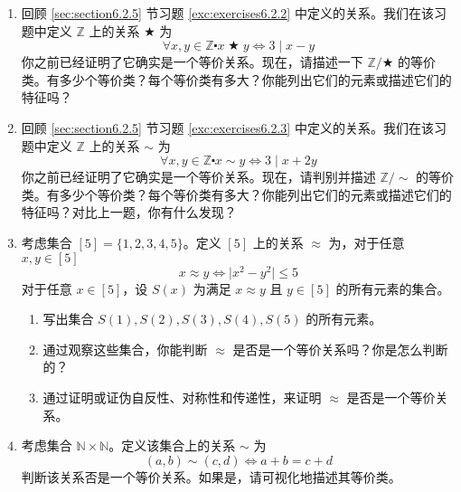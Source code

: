 \begin{enumerate}[label=(\arabic*)]
    \item 回顾 \ref{sec:section6.2.5} 节习题 \ref{exc:exercises6.2.2} 中定义的关系。我们在该习题中定义 $\mathbb{Z}$ 上的关系 $\bigstar$ 为
    \[\forall x, y \in \mathbb{Z} \centerdot x \;\bigstar\; y \iff 3 \mid x - y\]
    你之前已经证明了它确实是一个等价关系。现在，请描述一下 $\mathbb{Z}/\bigstar$ 的等价类。有多少个等价类？每个等价类有多大？你能列出它们的元素或描述它们的特征吗？
    \item 回顾 \ref{sec:section6.2.5} 节习题 \ref{exc:exercises6.2.3} 中定义的关系。我们在该习题中定义 $\mathbb{Z}$ 上的关系 $\sim$ 为
    \[\forall x, y \in \mathbb{Z} \centerdot x \sim y \iff 3 \mid x + 2y\]
    你之前已经证明了它确实是一个等价关系。现在，请判别并描述 $\mathbb{Z}/\sim$ 的等价类。有多少个等价类？每个等价类有多大？你能列出它们的元素或描述它们的特征吗？对比上一题，你有什么发现？
    \item 考虑集合 $[5]=\{1,2,3,4,5\}$。定义 $[5]$ 上的关系 $\approx$ 为，对于任意 $x,y \in [5]$
    \[x \approx y \iff \vert x^2 - y^2 \vert \le 5\]
    对于任意 $x \in [5]$，设 $S(x)$ 为满足 $x \approx y$ 且 $y \in [5]$ 的所有元素的集合。
    \begin{enumerate}[label=(\alph*)]
        \item 写出集合 $S(1), S(2), S(3), S(4), S(5)$ 的所有元素。
        \item 通过观察这些集合，你能判断 $\approx$ 是否是一个等价关系吗？你是怎么判断的？
        \item 通过证明或证伪自反性、对称性和传递性，来证明 $\approx$ 是否是一个等价关系。
    \end{enumerate}
    \item 考虑集合 $\mathbb{N} \times \mathbb{N}$。定义该集合上的关系 $\sim$ 为
    \[(a, b) \sim (c, d) \iff a + b = c + d\]
    判断该关系否是一个等价关系。如果是，请可视化地描述其等价类。
\end{enumerate}